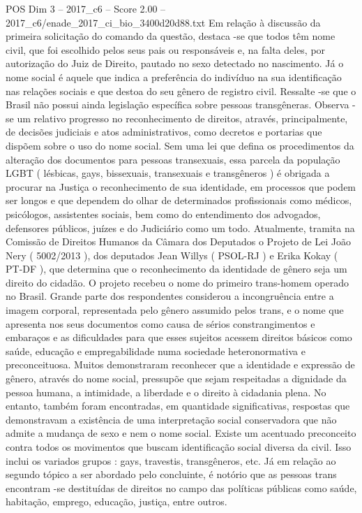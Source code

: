 \begin{textsample}{POS Dim 3 – 2017\_c6 – Score 2.00 – 2017\_c6/enade\_2017\_ci\_bio\_3400d20d88.txt}
Em relação à discussão da primeira solicitação do comando da questão, destaca -se que todos têm nome civil, que foi escolhido pelos seus pais ou responsáveis e, na falta deles, por autorização do Juiz de Direito, pautado no sexo detectado no nascimento.
Já o nome social é aquele que indica a preferência do indivíduo na sua identificação nas relações sociais e que destoa do seu gênero de registro civil.
Ressalte -se que o Brasil não possui ainda legislação específica sobre pessoas transgêneras.
Observa -se um relativo progresso no reconhecimento de direitos, através, principalmente, de decisões judiciais e atos administrativos, como decretos e portarias que dispõem sobre o uso do nome social.
Sem uma lei que defina os procedimentos da alteração dos documentos para pessoas transexuais, essa parcela da população LGBT ( lésbicas, gays, bissexuais, transexuais e transgêneros ) é obrigada a procurar na Justiça o reconhecimento de sua identidade, em processos que podem ser longos e que dependem do olhar de determinados profissionais como médicos, psicólogos, assistentes sociais, bem como do entendimento dos advogados, defensores públicos, juízes e do Judiciário como um todo.
Atualmente, tramita na Comissão de Direitos Humanos da Câmara dos Deputados o Projeto de Lei João Nery ( 5002/2013 ), dos deputados Jean Willys ( PSOL-RJ ) e Erika Kokay ( PT-DF ), que determina que o reconhecimento da identidade de gênero seja um direito do cidadão.
O projeto recebeu o nome do primeiro trans-homem operado no Brasil.
Grande parte dos respondentes considerou a incongruência entre a imagem corporal, representada pelo gênero assumido pelos trans, e o nome que apresenta nos seus documentos como causa de sérios constrangimentos e embaraços e as dificuldades para que esses sujeitos acessem direitos básicos como saúde, educação e empregabilidade numa sociedade heteronormativa e preconceituosa.
Muitos demonstraram reconhecer que a identidade e expressão de gênero, através do nome social, pressupõe que sejam respeitadas a dignidade da pessoa humana, a intimidade, a liberdade e o direito à cidadania plena.
No entanto, também foram encontradas, em quantidade significativas, respostas que demonstravam a existência de uma interpretação social conservadora que não admite a mudança de sexo e nem o nome social.
Existe um acentuado preconceito contra todos os movimentos que buscam identificação social diversa da civil.
Isso inclui os variados grupos : gays, travestis, transgêneros, etc.
Já em relação ao segundo tópico a ser abordado pelo concluinte, é notório que as pessoas trans encontram -se destituídas de direitos no campo das políticas públicas como saúde, habitação, emprego, educação, justiça, entre outros.

\end{textsample}
